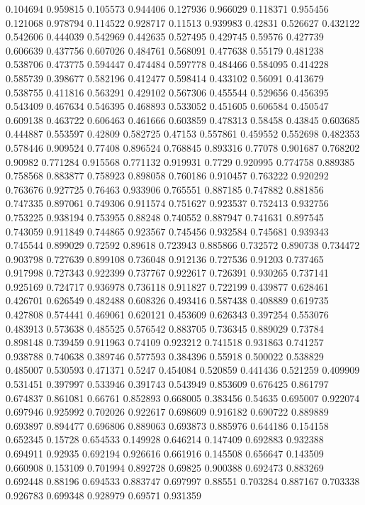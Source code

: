 0.104694 0.959815
0.105573 0.944406
0.127936 0.966029
0.118371 0.955456
0.121068 0.978794
0.114522 0.928717
0.11513 0.939983
0.42831 0.526627
0.432122 0.542606
0.444039 0.542969
0.442635 0.527495
0.429745 0.59576
0.427739 0.606639
0.437756 0.607026
0.484761 0.568091
0.477638 0.55179
0.481238 0.538706
0.473775 0.594447
0.474484 0.597778
0.484466 0.584095
0.414228 0.585739
0.398677 0.582196
0.412477 0.598414
0.433102 0.56091
0.413679 0.538755
0.411816 0.563291
0.429102 0.567306
0.455544 0.529656
0.456395 0.543409
0.467634 0.546395
0.468893 0.533052
0.451605 0.606584
0.450547 0.609138
0.463722 0.606463
0.461666 0.603859
0.478313 0.58458
0.43845 0.603685
0.444887 0.553597
0.42809 0.582725
0.47153 0.557861
0.459552 0.552698
0.482353 0.578446
0.909524 0.77408
0.896524 0.768845
0.893316 0.77078
0.901687 0.768202
0.90982 0.771284
0.915568 0.771132
0.919931 0.7729
0.920995 0.774758
0.889385 0.758568
0.883877 0.758923
0.898058 0.760186
0.910457 0.763222
0.920292 0.763676
0.927725 0.76463
0.933906 0.765551
0.887185 0.747882
0.881856 0.747335
0.897061 0.749306
0.911574 0.751627
0.923537 0.752413
0.932756 0.753225
0.938194 0.753955
0.88248 0.740552
0.887947 0.741631
0.897545 0.743059
0.911849 0.744865
0.923567 0.745456
0.932584 0.745681
0.939343 0.745544
0.899029 0.72592
0.89618 0.723943
0.885866 0.732572
0.890738 0.734472
0.903798 0.727639
0.899108 0.736048
0.912136 0.727536
0.91203 0.737465
0.917998 0.727343
0.922399 0.737767
0.922617 0.726391
0.930265 0.737141
0.925169 0.724717
0.936978 0.736118
0.911827 0.722199
0.439877 0.628461
0.426701 0.626549
0.482488 0.608326
0.493416 0.587438
0.408889 0.619735
0.427808 0.574441
0.469061 0.620121
0.453609 0.626343
0.397254 0.553076
0.483913 0.573638
0.485525 0.576542
0.883705 0.736345
0.889029 0.73784
0.898148 0.739459
0.911963 0.74109
0.923212 0.741518
0.931863 0.741257
0.938788 0.740638
0.389746 0.577593
0.384396 0.55918
0.500022 0.538829
0.485007 0.530593
0.471371 0.5247
0.454084 0.520859
0.441436 0.521259
0.409909 0.531451
0.397997 0.533946
0.391743 0.543949
0.853609 0.676425
0.861797 0.674837
0.861081 0.66761
0.852893 0.668005
0.383456 0.54635
0.695007 0.922074
0.697946 0.925992
0.702026 0.922617
0.698609 0.916182
0.690722 0.889889
0.693897 0.894477
0.696806 0.889063
0.693873 0.885976
0.644186 0.154158
0.652345 0.15728
0.654533 0.149928
0.646214 0.147409
0.692883 0.932388
0.694911 0.92935
0.692194 0.926616
0.661916 0.145508
0.656647 0.143509
0.660908 0.153109
0.701994 0.892728
0.69825 0.900388
0.692473 0.883269
0.692448 0.88196
0.694533 0.883747
0.697997 0.88551
0.703284 0.887167
0.703338 0.926783
0.699348 0.928979
0.69571 0.931359
